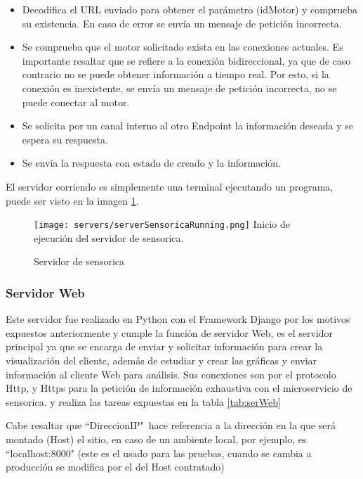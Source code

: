     \begin{itemize}
        \item Decodifica el URL enviado para obtener el parámetro (idMotor) y
            comprueba su existencia. En caso de error se envía un mensaje
            de petición incorrecta.
        \item Se comprueba que el motor solicitado exista en las conexiones
            actuales. Es importante resaltar que se refiere a la conexión
            bidireccional, ya que de caso contrario no se puede obtener información
            a tiempo real. Por esto, si la conexión es inexistente, se envía un
            mensaje de petición incorrecta, no se puede conectar al motor.
        \item Se solicita por un canal interno al otro Endpoint la información
            deseada y se espera su respuesta.
        \item Se envía la respuesta con estado de creado y la información.
    \end{itemize}

    El servidor corriendo es simplemente una terminal ejecutando un programa,
    puede ser visto en la imagen \ref{img:serverSensoricaRunning}.

	\begin{figure}[htb]
		\centering
        \caption{Servidor de sensorica}
        \texttt{[image: servers/serverSensoricaRunning.png]}
        Inicio de ejecución del servidor de sensorica.    \label{img:serverSensoricaRunning}
	\end{figure}

    \subsubsection{Servidor Web}
    Este servidor fue realizado en Python con el Framework Django
    por los motivos expuestos anteriormente y cumple la función de servidor Web,
    es el servidor principal ya que se encarga de enviar y solicitar información
    para crear la visualización del cliente, además de estudiar y crear las gráficas
    y enviar información al cliente Web para análisis.
    Sus conexiones son por el protocolo Http, y Https para la petición de información
    exhaustiva con el microservicio de sensorica. y realiza las tareas expuestas
    en la tabla \ref{tab:serWeb}

    Cabe resaltar que ``DireccionIP"\ hace referencia a la dirección en la
    que será montado (Host) el sitio, en caso de un ambiente local, por
    ejemplo, es ``localhost:8000" (este es el usado para las pruebas,
    cuando se cambia a producción se modifica por el del Host contratado)

